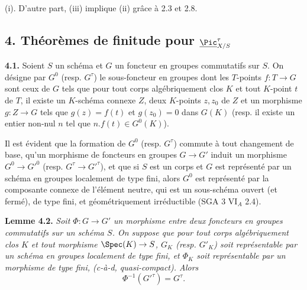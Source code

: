 
(i). D'autre part, (iii) implique (ii) gr\^ace \`a 2.3 et 2.8.

\subsection*{4. Th\'eor\`emes de finitude pour $\underline{\Pic}^\tau_{X/S}$}

\textbf{4.1.} Soient \(S\) un sch\'ema et \(G\) un foncteur en groupes commutatifs sur \(S\). On d\'esigne par \(G^0\) (resp. \(G^\tau\)) le sous-foncteur en groupes dont les \(T\)-points \(f:T\to G\) sont ceux de \(G\) tels que pour tout corps alg\'ebriquement clos \(K\) et tout \(K\)-point \(t\) de \(T\), il existe un \(K\)-sch\'ema connexe \(Z\), deux \(K\)-points \(z,z_0\) de \(Z\) et un morphisme \(g:Z\to G\) tels que \(g(z)=f(t)\) et \(g(z_0)=0\) dans \(G(K)\) (resp. il existe un entier non-nul \(n\) tel que \(n.f(t)\in G^0(K)\)).

Il est \'evident que la formation de \(G^0\) (resp. \(G^\tau\)) commute \`a tout changement de base, qu'un morphisme de foncteurs en groupes \(G\to G'\) induit un morphisme \(G^0\to G'^0\) (resp. \(G^\tau\to G'^\tau\)), et que si \(S\) est un corps et \(G\) est repr\'esent\'e par un sch\'ema en groupes localement de type fini, alors \(G^0\) est repr\'esent\'e par la composante connexe de l'\'el\'ement neutre, qui est un sous-sch\'ema ouvert (et ferm\'e), de type fini, et g\'eom\'etriquement irr\'eductible (SGA 3 VI\(_A\) 2.4).

\textbf{Lemme 4.2.} \emph{Soit \(\Phi:G\to G'\) un morphisme entre deux foncteurs en groupes commutatifs sur un sch\'ema \(S\). On suppose que pour tout corps alg\'ebriquement clos \(K\) et tout morphisme \(\Spec(K)\to S\), \(G_K\) (resp. \(G'_K\)) soit repr\'esentable par un sch\'ema en groupes localement de type fini, et \(\Phi_K\) soit repr\'esentable par un morphisme de type fini, (c-\`a-d, quasi-compact). Alors}
\[
  \Phi^{-1}(G'^\tau)=G^\tau.
\]

